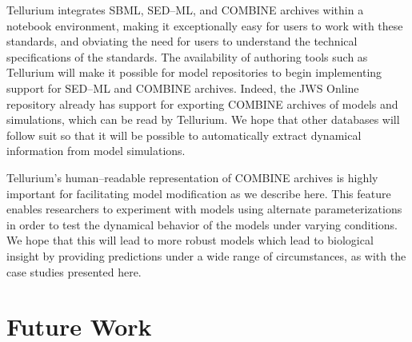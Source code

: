 \documentclass[10pt,letterpaper]{article}
\begin{document}
Tellurium integrates SBML, SED--ML, and COMBINE archives within a notebook environment, making it exceptionally easy for users to work with these standards, and obviating the need for users to understand the technical specifications of the standards. The availability of authoring tools such as Tellurium will make it possible for model repositories to begin implementing support for SED--ML and COMBINE archives. Indeed, the JWS Online repository \cite{olivier2004web} already has support for exporting COMBINE archives of models and simulations, which can be read by Tellurium. We hope that other databases will follow suit so that it will be possible to automatically extract dynamical information from model simulations.



Tellurium's human--readable representation of COMBINE archives is highly important for facilitating model modification as we describe here. This feature enables researchers to experiment with models using alternate parameterizations in order to test the dynamical behavior of the models under varying conditions. We hope that this will lead to more robust models which lead to biological insight by providing predictions under a wide range of circumstances, as with the case studies presented here.

\section*{Future Work}
\end{document}
